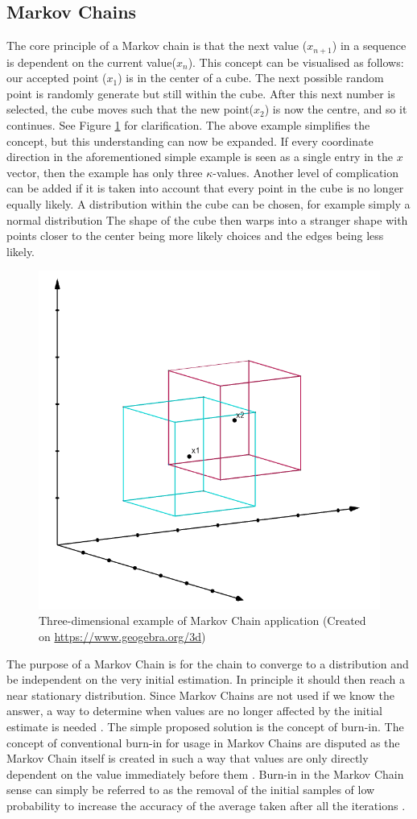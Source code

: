 	\subsection{Markov Chains}	
	The core principle of a Markov chain is that the next value ($x_{n+1}$) in a sequence is dependent on the current value($x_n$). 
	This concept can be visualised as follows: our accepted point ($x_1$) is in the center of a cube. The next possible random point is randomly generate but still within the cube. 	
	After this next number is selected, the cube moves such that the new point($x_2$) is now the centre, and so it continues.
	See Figure \ref{cubeexplfig} for clarification.
	The above example simplifies the concept, but this understanding can now be expanded.
	If every coordinate direction in the aforementioned simple example is seen as a single entry in the $x$ vector, then the example has only three $\kappa$-values.
	Another level of complication can be added if it is taken into account that every point in the cube is no longer equally likely.
	A distribution within the cube can be chosen, for example simply a normal distribution
	The shape of the cube then warps into a stranger shape with points closer to the center being more likely choices and the edges being less likely.
	\begin{figure}	
	\centering
	\includegraphics[width=0.55\linewidth]{figures/MC_cubes.png}
	\caption{Three-dimensional example of Markov Chain application (Created on \url{https://www.geogebra.org/3d})}
	\label{cubeexplfig}
	\end{figure}
	
	The purpose of a Markov Chain is for the chain to converge to a distribution and be independent on the very initial estimation. 
	In principle it should then reach a near stationary distribution.
	Since Markov Chains are not used if we know the answer, a way to determine when values are no longer affected by the initial estimate is needed \cite{Gilks:1996}. 
	The simple proposed solution is the concept of burn-in. 
	The concept of conventional burn-in for usage in Markov Chains are disputed as the Markov Chain itself is created in such a way that values are only directly dependent on the value immediately before them \cite{Meyn:1993}.
	Burn-in in the Markov Chain sense can simply be referred to as the removal of the initial samples of low probability to increase the accuracy of the average taken after all the iterations \cite{John:2016}.
	
